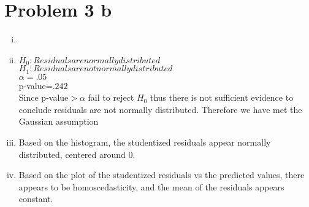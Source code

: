 \documentclass{article}
\begin{document}
\begin{flushleft}
\begin{enumerate}[(a)]
\end{enumerate}
\pagebreak
	\section*{Problem 3 b}
	
\begin{enumerate}[(i)]
\item 
\item $H_0: Residuals are normally distributed$\\
$H_1: Residuals are not normally distributed$\\
$\alpha=.05$\\
p-value=$.242$\\
Since p-value$>\alpha$ fail to reject $H_0$ thus there is not sufficient evidence to conclude residuals are not normally distributed. Therefore we have met the Gaussian assumption

\item Based on the histogram, the studentized residuals appear normally distributed, centered around 0.

\item Based on the plot of the studentized residuals vs the predicted values, there appears to be homoscedasticity, and the mean of the residuals appears constant.


	
\end{enumerate}


\end{flushleft}
\end{document}
